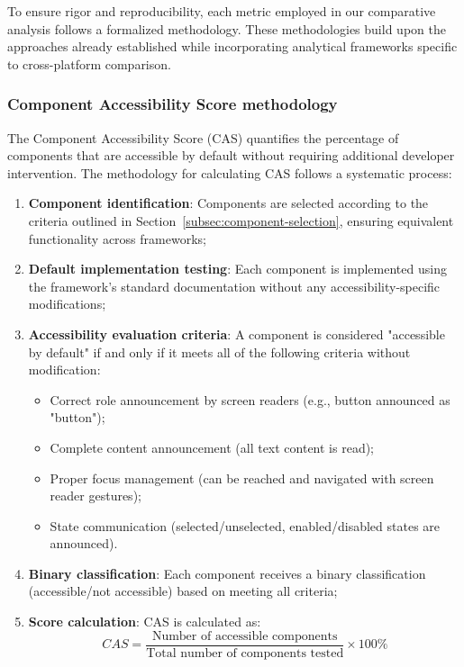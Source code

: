 To ensure rigor and reproducibility, each metric employed in our comparative analysis follows a formalized methodology. These methodologies build upon the approaches already established while incorporating analytical frameworks specific to cross-platform comparison.

\subsubsection{Component Accessibility Score methodology}
\label{subsubsec:cas-methodology}

The Component Accessibility Score (CAS) quantifies the percentage of components that are accessible by default without requiring additional developer intervention. The methodology for calculating CAS follows a systematic process:

\begin{enumerate}
    \item \textbf{Component identification}: Components are selected according to the criteria outlined in Section~\ref{subsec:component-selection}, ensuring equivalent functionality across frameworks;
    
    \item \textbf{Default implementation testing}: Each component is implemented using the framework's standard documentation without any accessibility-specific modifications;
    
    \item \textbf{Accessibility evaluation criteria}: A component is considered "accessible by default" if and only if it meets all of the following criteria without modification:
    \begin{itemize}
        \item Correct role announcement by screen readers (e.g., button announced as "button");
        \item Complete content announcement (all text content is read);
        \item Proper focus management (can be reached and navigated with screen reader gestures);
        \item State communication (selected/unselected, enabled/disabled states are announced).
    \end{itemize}
    
    \item \textbf{Binary classification}: Each component receives a binary classification (accessible/not accessible) based on meeting all criteria;
    
    \item \textbf{Score calculation}: CAS is calculated as:
    \begin{equation}
    CAS = \frac{\text{Number of accessible components}}{\text{Total number of components tested}} \times 100\%
    \end{equation}
\end{enumerate}

